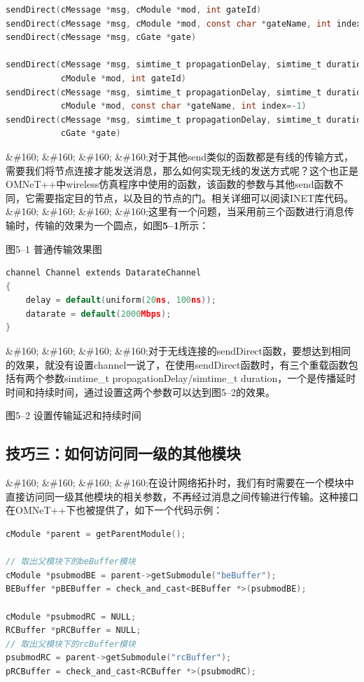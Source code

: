 \begin{lstlisting}[language=c,caption=My]
sendDirect(cMessage *msg, cModule *mod, int gateId)
sendDirect(cMessage *msg, cModule *mod, const char *gateName, int index=-1)
sendDirect(cMessage *msg, cGate *gate)

sendDirect(cMessage *msg, simtime_t propagationDelay, simtime_t duration,
           cModule *mod, int gateId)
sendDirect(cMessage *msg, simtime_t propagationDelay, simtime_t duration,
           cModule *mod, const char *gateName, int index=-1)
sendDirect(cMessage *msg, simtime_t propagationDelay, simtime_t duration,
           cGate *gate)

\end{lstlisting}

\&\#160; \&\#160; \&\#160; \&\#160;对于其他send类似的函数都是有线的传输方式，需要我们将节点连接才能发送消息，那么如何实现无线的发送方式呢？这个也正是OMNeT++中wireless仿真程序中使用的函数，该函数的参数与其他send函数不同，它需要指定目的节点，以及目的节点的门。相关详细可以阅读INET库代码。
\&\#160; \&\#160; \&\#160; \&\#160;这里有一个问题，当采用前三个函数进行消息传输时，传输的效果为一个圆点，如图\textbf{5--1}所示：

图5--1 普通传输效果图

\begin{lstlisting}[language=c]
channel Channel extends DatarateChannel
{
    delay = default(uniform(20ns, 100ns));
    datarate = default(2000Mbps);
}

\end{lstlisting}

\&\#160; \&\#160; \&\#160; \&\#160;对于无线连接的sendDirect函数，要想达到相同的效果，就没有设置channel一说了，在使用sendDirect函数时，有三个重载函数包括有两个参数simtime\_t propagationDelay\slash simtime\_t duration，一个是传播延时时间和持续时间，通过设置这两个参数可以达到图5--2的效果。

图5--2 设置传输延迟和持续时间

\subsection{技巧三：如何访问同一级的其他模块}
\label{技巧三：如何访问同一级的其他模块}

\&\#160; \&\#160; \&\#160; \&\#160;在设计网络拓扑时，我们有时需要在一个模块中直接访问同一级其他模块的相关参数，不再经过消息之间传输进行传输。这种接口在OMNeT++下也被提供了，如下一个代码示例：

\begin{lstlisting}[language=c]
cModule *parent = getParentModule();

// 取出父模块下的beBuffer模块
cModule *psubmodBE = parent->getSubmodule("beBuffer");
BEBuffer *pBEBuffer = check_and_cast<BEBuffer *>(psubmodBE);

cModule *psubmodRC = NULL;
RCBuffer *pRCBuffer = NULL;
// 取出父模块下的rcBuffer模块
psubmodRC = parent->getSubmodule("rcBuffer");
pRCBuffer = check_and_cast<RCBuffer *>(psubmodRC);

\end{lstlisting}

